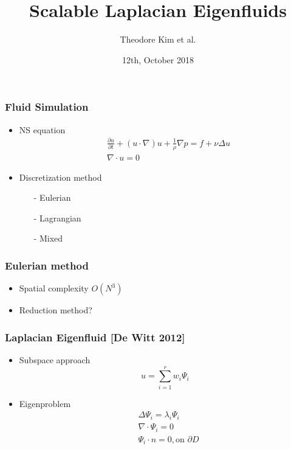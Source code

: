\documentclass[serif,mathserif, 12pt]{beamer}
\title[\hspace{2em}\insertframenumber/\inserttotalframenumber]{Scalable Laplacian Eigenfluids}
\date{12th, October 2018}
\author{Theodore Kim et al.}
\begin{document}
\maketitle

\begin{frame}
  \frametitle{Fluid Simulation}
  \begin{itemize}
  \item NS equation
    \[
    \begin{split}
      &\frac{\partial u}{\partial t}+(u\cdot \nabla )u+\frac{1}{\rho}\nabla p
      = f+\nu \Delta u \\
      &\nabla \cdot u = 0
    \end{split}
    \]
   \pause
  \item Discretization method
    \begin{itemize}
    \item[-] Eulerian
    \item[-] Lagrangian
    \item[-] Mixed
    \end{itemize}
  \end{itemize}
\end{frame}

\begin{frame}
  \frametitle{Eulerian method}
  \begin{itemize}
  \item Spatial complexity $O(N^3)$
    \pause
  \item Reduction method?
  \end{itemize}
\end{frame}

\begin{frame}
  \frametitle{Laplacian Eigenfluid [De Witt 2012]}
  \begin{itemize}
  \item Subspace approach
    \[
    u = \sum_{i=1}^r w_i \Psi_i
    \]
  \item Eigenproblem
    \[
    \begin{split}
      &\Delta \Psi_i = \lambda_i \Psi_i \\
      &\nabla \cdot \Psi_i = 0 \\
      &\Psi_i \cdot n = 0, \text{on~} \partial D
    \end{split}
    \]
  \end{itemize}
\end{frame}
\end{document}
